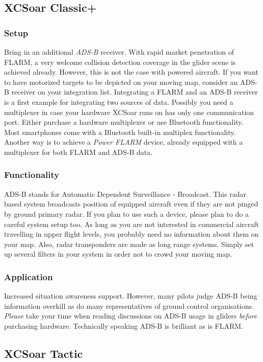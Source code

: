 \subsection*{XCSoar Classic+}
\subsubsection*{Setup} Bring in an additional \emph{ADS-B} receiver. With rapid 
market penetration of FLARM, a very welcome collision detection coverage in the
glider scene is achieved already. However, this is not the case with powered aircraft.
If you want to have motorized targets to be depicted on your
moving map, consider an ADS-B receiver on your integration list. Integrating a 
FLARM and an ADS-B receiver is a first example for integrating two sources of
data. Possibly you need a multiplexer in case your hardware XCSoar runs on has
only one communication port. Either purchase a hardware multiplexer or use
Bluetooth functionality. Most smartphones come with a Bluetooth built-in
multiplex functionality. Another way is to achieve a \emph{Power FLARM} device,
already equipped with a multiplexer for both FLARM and ADS-B data.

\subsubsection*{Functionality} ADS-B stands for Automatic Dependent Surveillance 
- Broadcast. 
This radar based system broadcasts position of equipped aircraft even if they
are not pinged by ground primary radar. If you plan to use such a device, 
please plan to do a careful system setup too. As long as you are not interested in
commercial aircraft travelling in upper flight levels, you probably need
no information about them on your map. Also, radar transponders are made as long
range systems. Simply set up several filters in your system in order not to
crowd your moving map.

\subsubsection*{Application} Increased situation awareness support. However, many 
pilots judge ADS-B being information overkill as do many representatives of 
ground control organisations. \emph{Please} take your time when reading 
discussions on ADS-B usage in gliders \emph{before} purchasing hardware. 
Technically speaking ADS-B is brilliant as is FLARM.

\subsection*{XCSoar Tactic}
